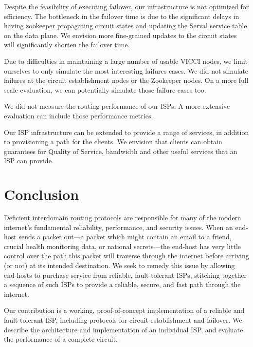 \documentclass{article}
\begin{document}
Despite the feasibility of executing failover, our infrastructure is
not optimized for efficiency. The bottleneck in the failover time is
due to the significant delays in having zookeeper propagating circuit
states and updating the Serval service table on the data plane. We
envision more fine-grained updates to the circuit states will
significantly shorten the failover time.

Due to difficulties in maintaining a large number of usable VICCI
nodes, we limit ourselves to only simulate the most interesting
failures cases. We did not simulate failures at the circuit
establishment nodes or the Zookeeper nodes. On a more full scale
evaluation, we can potentially simulate those failure cases too.

We did not measure the routing performance of our ISPs. A more
extensive evaluation can include those performance metrics.

Our ISP infrastructure can be extended to provide a range of services,
in addition to provisioning a path for the clients. We envision that
clients can obtain guarantees for Quality of Service, bandwidth and
other useful services that an ISP can provide.

\section{Conclusion}
Deficient interdomain routing protocols are responsible for many of
the modern internet's fundamental reliability, performance, and
security issues. When an end-host sends a packet out---a packet which
might contain an email to a friend, crucial health monitoring data, or
national secrets---the end-host has very little control over the path
this packet will traverse through the internet before arriving (or
not) at its intended destination. We seek to remedy this issue by
allowing end-hosts to purchase service from reliable, fault-tolerant
ISPs, stitching together a sequence of such ISPs to provide a
reliable, secure, and fast path through the internet.

Our contribution is a working, proof-of-concept implementation of a
reliable and fault-tolerant ISP, including protocols for circuit
establishment and failover. We describe the architecture and
implementation of an individual ISP, and evaluate the performance of a
complete circuit.



\end{document}
